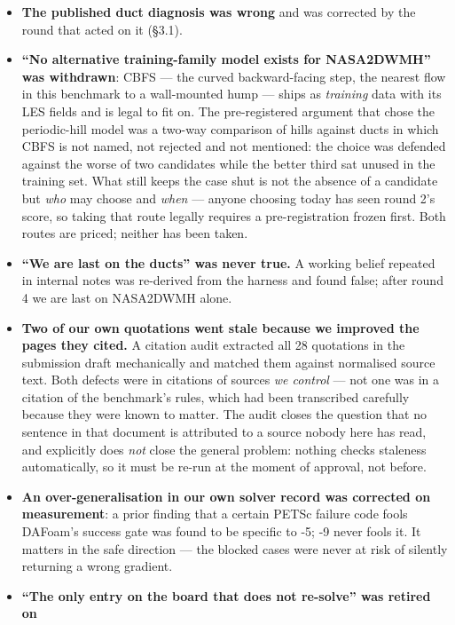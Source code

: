 \documentclass[11pt,a4paper]{article}
\newcommand{\breakus}{\textunderscore\allowbreak}
\newcommand{\code}[1]{{\small\ttfamily\let\_\breakus #1}}
\begin{document}
\begin{itemize}
\item \textbf{The published duct diagnosis was wrong} and was corrected by the round that
  acted on it (\S3.1).
\item \textbf{``No alternative training-family model exists for \code{NASA\_2DWMH}'' was
  withdrawn}: CBFS --- the curved backward-facing step, the nearest flow in this benchmark
  to a wall-mounted hump --- ships as \emph{training} data with its LES fields and is legal
  to fit on. The pre-registered argument that chose the periodic-hill model was a two-way
  comparison of hills against ducts in which CBFS is not named, not rejected and not
  mentioned: the choice was defended against the worse of two candidates while the better
  third sat unused in the training set. What still keeps the case shut is not the absence of
  a candidate but \emph{who} may choose and \emph{when} --- anyone choosing today has seen
  round 2's score, so taking that route legally requires a pre-registration frozen first.
  Both routes are priced; neither has been taken.
\item \textbf{``We are last on the ducts'' was never true.} A working belief repeated in
  internal notes was re-derived from the harness and found false; after round 4 we are last
  on \code{NASA\_2DWMH} alone.
\item \textbf{Two of our own quotations went stale because we improved the pages they
  cited.} A citation audit extracted all 28 quotations in the submission draft mechanically
  and matched them against normalised source text. Both defects were in citations of sources
  \emph{we control} --- not one was in a citation of the benchmark's rules, which had been
  transcribed carefully because they were known to matter. The audit closes the question
  that no sentence in that document is attributed to a source nobody here has read, and
  explicitly does \emph{not} close the general problem: nothing checks staleness
  automatically, so it must be re-run at the moment of approval, not before.
\item \textbf{An over-generalisation in our own solver record was corrected on
  measurement}: a prior finding that a certain PETSc failure code fools DAFoam's success
  gate was found to be specific to \code{-5}; \code{-9} never fools it. It matters in the
  safe direction --- the blocked cases were never at risk of silently returning a wrong
  gradient.
\item \textbf{``The only entry on the board that does not re-solve'' was retired on
}
\end{itemize}
\end{document}

